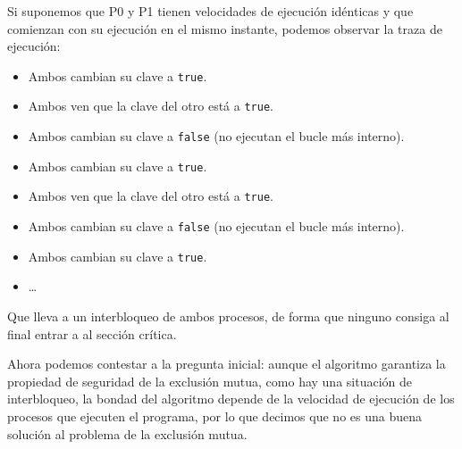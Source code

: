 \begin{ejercicio}
\begin{enumerate}[label=(\alph*)]
            Si suponemos que P0 y P1 tienen velocidades de ejecución idénticas y que comienzan con su ejecución en el mismo instante, podemos observar la traza de ejecución:
            \begin{itemize}
                \item Ambos cambian su clave a \verb|true|.
                \item Ambos ven que la clave del otro está a \verb|true|.
                \item Ambos cambian su clave a \verb|false| (no ejecutan el bucle más interno).
                \item Ambos cambian su clave a \verb|true|.
                \item Ambos ven que la clave del otro está a \verb|true|.
                \item Ambos cambian su clave a \verb|false| (no ejecutan el bucle más interno).
                \item Ambos cambian su clave a \verb|true|.
                \item \ldots
            \end{itemize}
            Que lleva a un interbloqueo de ambos procesos, de forma que ninguno consiga al final entrar a al sección crítica.
    \end{enumerate}
    Ahora podemos contestar a la pregunta inicial: aunque el algoritmo garantiza la propiedad de seguridad de la exclusión mutua, como hay una situación de interbloqueo, la bondad del algoritmo depende de la velocidad de ejecución de los procesos que ejecuten el programa, por lo que decimos que no es una buena solución al problema de la exclusión mutua.
\end{ejercicio}

